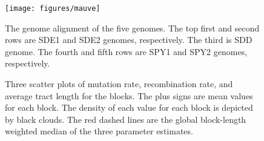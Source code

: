 \documentclass[10pt]{article}
\newcommand{\lyxdot}{.}
\begin{document}

\clearpage{}

\begin{figure}
\begin{center}
\texttt{[image: figures/mauve]}
\end{center}
\caption{\label{fig:mauve}The genome alignment of the five genomes. The top
first and second rows are SDE1 and SDE2 genomes, respectively. The third is SDD
genome. The fourth and fifth rows are SPY1 and SPY2 genomes, respectively.}
\end{figure}
\clearpage{}


\begin{figure}
\begin{center}


\end{center}
\caption{\label{fig:scatter3}Three scatter plots of mutation rate, recombination
rate, and average tract length for the blocks. The plus signs are mean values
for each block. The density of each value for each block is depicted by black
clouds.  The red dashed lines are the global block-length weighted median of the
three parameter estimates.}
\end{figure}
\clearpage{}%
\end{document}
